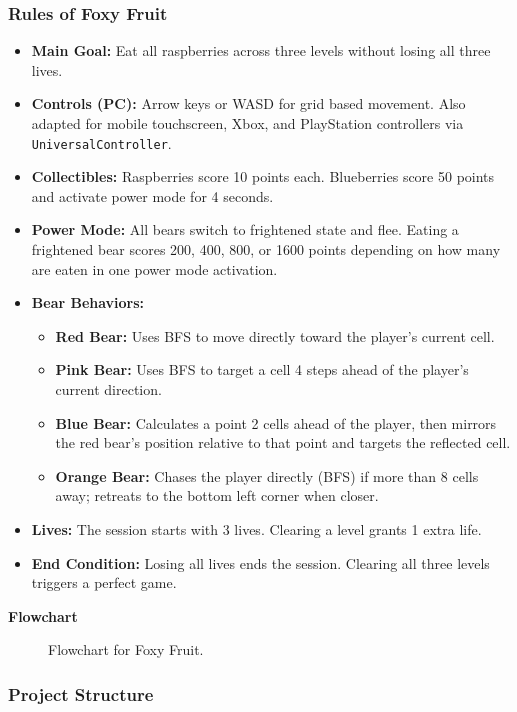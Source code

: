 \documentclass[12pt,letterpaper]{article}
\begin{document}
\subsubsection{Rules of Foxy Fruit}
\begin{itemize}
  \item \textbf{Main Goal:} Eat all raspberries across three levels without losing all three lives.
  \item \textbf{Controls (PC):} Arrow keys or WASD for grid based movement. Also adapted for mobile touchscreen, Xbox, and PlayStation controllers via \texttt{UniversalController}.
  \item \textbf{Collectibles:} Raspberries score 10 points each. Blueberries score 50 points and activate power mode for 4 seconds.
  \item \textbf{Power Mode:} All bears switch to frightened state and flee. Eating a frightened bear scores 200, 400, 800, or 1600 points depending on how many are eaten in one power mode activation.
  \item \textbf{Bear Behaviors:}
  \begin{itemize}
    \item \textbf{Red Bear:} Uses BFS to move directly toward the player's current cell.
    \item \textbf{Pink Bear:} Uses BFS to target a cell 4 steps ahead of the player's current direction.
    \item \textbf{Blue Bear:} Calculates a point 2 cells ahead of the player, then mirrors the red bear's position relative to that point and targets the reflected cell.
    \item \textbf{Orange Bear:} Chases the player directly (BFS) if more than 8 cells away; retreats to the bottom left corner when closer.
  \end{itemize}
  \item \textbf{Lives:} The session starts with 3 lives. Clearing a level grants 1 extra life.
  \item \textbf{End Condition:} Losing all lives ends the session. Clearing all three levels triggers a perfect game.
\end{itemize}

\textbf{Flowchart}
\begin{figure}[H]
  \centering
  
  \caption{Flowchart for Foxy Fruit.}
  \label{fig:foxyfruit_flow}
\end{figure}

\subsubsection{Project Structure}
\end{document}

